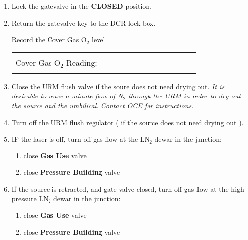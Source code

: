 \begin{enumerate}
\item\checkbox Lock the gatevalve in the {\bf CLOSED} position.
\item\checkbox Return the gatevalve key to the DCR lock box.
 
 \checkitem Record the Cover Gas O$_2$ level
     \begin{center}
     \begin{tabular}{|l|}
     \hline
      \\
     Cover Gas O$_2$ Reading:~~~~~~~~~~~~~~~~~~~~~~~~\\
      \\
     \hline
     \end{tabular}
     \end{center}

\item\checkbox Close the URM flush valve if the soure does not need drying out.
\small
{\em It is desirable to leave a minute flow of N$_2$ through the URM in order to dry
out the source and the umbilical. Contact OCE for instructions.}

\normalsize
\item\checkbox Turn off the URM flush regulator ( if the source does not need drying out ).

\item\checkbox IF the laser is off,
   turn off gas flow at the LN$_2$ dewar in the junction:
   \begin{enumerate}
   \item close {\bf Gas Use} valve
   \item close {\bf Pressure Building} valve
   \end{enumerate}


 \item\checkbox If the source is retracted, and gate valve closed,
   turn off gas flow at the high pressure LN$_2$ dewar in the junction:
   \begin{enumerate}
   \item close {\bf Gas Use} valve
   \item close {\bf Pressure Building} valve
   \end{enumerate}







\end{enumerate}
